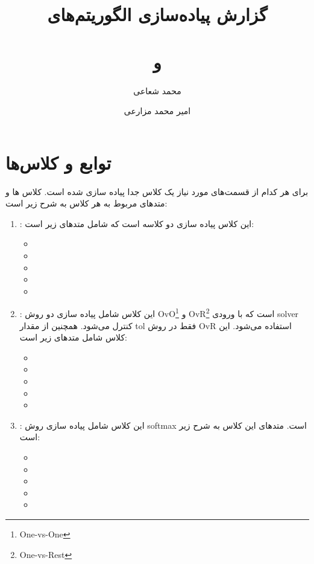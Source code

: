 \documentclass[]{article}
\title{گزارش پیاده‌سازی الگوریتم‌های \\ \lr{Logistic Regression} \\ و \\ \lr{‌Softmax}}
\author{محمد شعاعی\\ \and امیر محمد مزارعی}
\begin{document}
\maketitle
	
\part{توابع و کلاس‌ها}
برای هر کدام از قسمت‌های مورد نیاز یک کلاس جدا پیاده سازی شده است. کلاس ها و متدهای مربوط به هر کلاس به شرح زیر است:
\begin{enumerate}
	\item {}: این کلاس پیاده سازی  دو کلاسه است که شامل متد‌های زیر است:
	\begin{itemize}
		\item {}
		\item {}
		\item {}
		\item {}
		\item {}
	\end{itemize}
	\item {}: این کلاس شامل پیاده سازی دو روش OvO\footnote{One-vs-One} و OvR\footnote{One-vs-Rest} است که با ورودی solver کنترل می‌شود. همچنین از مقدار tol فقط در روش OvR استفاده می‌شود. این کلاس شامل متدهای زیر است:
	\begin{itemize}
		\item {}
		\item {}
		\item {}
		\item {}
		\item {}
	\end{itemize}
	\item {}: این کلاس شامل پیاده سازی روش softmax است. متدهای این کلاس به شرح زیر است:
	\begin{itemize}
		\item {}
		\item {}
		\item {}
		\item {}
		\item {}
	\end{itemize}


\end{enumerate}
\end{document}
